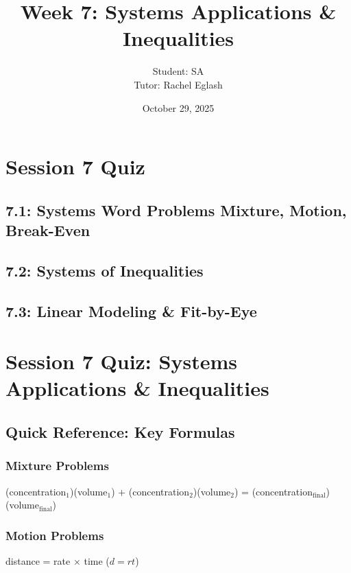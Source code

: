 \documentclass[12pt]{article}
\title{Week 7: Systems Applications \& Inequalities}
\author{
	Student: SA\\
	Tutor: Rachel Eglash}
\date{October 29, 2025}
\begin{document}
	
	\maketitle

	\section*{Session 7 Quiz}
        
        \subsection*{7.1: Systems Word Problems Mixture, Motion, Break-Even}

	    \subsection*{7.2: Systems of Inequalities}
        
        \subsection*{7.3: Linear Modeling \& Fit-by-Eye}
	    
            \newpage
	
	\section*{Session 7 Quiz: Systems Applications \& Inequalities}

        \vspace{1cm}
	
	    \subsection*{Quick Reference: Key Formulas}
	
	        \subsubsection*{Mixture Problems}
		    	(concentration$_1$)(volume$_1$) + (concentration$_2$)(volume$_2$) = (concentration$_{\text{final}}$)(volume$_{\text{final}}$)
	
	        \subsubsection*{Motion Problems}
			    distance = rate $\times$ time \quad ($d = rt$)
	
\end{document}
